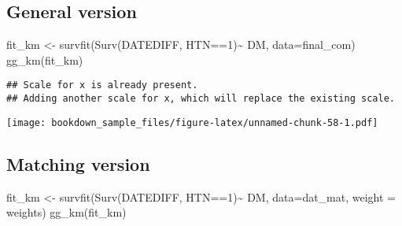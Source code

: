 \documentclass[
]{book}
\newenvironment{Shaded}{\begin{snugshade}}{\end{snugshade}}
\newcommand{\AttributeTok}[1]{\textcolor[rgb]{0.77,0.63,0.00}{#1}}
\newcommand{\DecValTok}[1]{\textcolor[rgb]{0.00,0.00,0.81}{#1}}
\newcommand{\FloatTok}[1]{\textcolor[rgb]{0.00,0.00,0.81}{#1}}
\newcommand{\FunctionTok}[1]{\textcolor[rgb]{0.00,0.00,0.00}{#1}}
\newcommand{\NormalTok}[1]{#1}
\newcommand{\OtherTok}[1]{\textcolor[rgb]{0.56,0.35,0.01}{#1}}
\newcommand{\SpecialCharTok}[1]{\textcolor[rgb]{0.00,0.00,0.00}{#1}}
\begin{document}
\begin{Shaded}
\end{Shaded}

\hypertarget{general-version}{%
\subsection{General version}\label{general-version}}

\begin{Shaded}
\begin{Highlighting}[]
\NormalTok{fit\_km }\OtherTok{\textless{}{-}} \FunctionTok{survfit}\NormalTok{(}\FunctionTok{Surv}\NormalTok{(DATEDIFF, HTN}\SpecialCharTok{==}\DecValTok{1}\NormalTok{)}\SpecialCharTok{\textasciitilde{}}\NormalTok{ DM, }\AttributeTok{data=}\NormalTok{final\_com)}
\FunctionTok{gg\_km}\NormalTok{(fit\_km)}
\end{Highlighting}
\end{Shaded}

\begin{verbatim}
## Scale for x is already present.
## Adding another scale for x, which will replace the existing scale.
\end{verbatim}

\texttt{[image: bookdown\_sample\_files/figure-latex/unnamed-chunk-58-1.pdf]}

\hypertarget{matching-version}{%
\subsection{Matching version}\label{matching-version}}

\begin{Shaded}
\begin{Highlighting}[]
\NormalTok{fit\_km }\OtherTok{\textless{}{-}} \FunctionTok{survfit}\NormalTok{(}\FunctionTok{Surv}\NormalTok{(DATEDIFF, HTN}\SpecialCharTok{==}\DecValTok{1}\NormalTok{)}\SpecialCharTok{\textasciitilde{}}\NormalTok{ DM, }\AttributeTok{data=}\NormalTok{dat\_mat, }\AttributeTok{weight =}\NormalTok{ weights)}
\FunctionTok{gg\_km}\NormalTok{(fit\_km)}
\end{Highlighting}
\end{Shaded}
\end{document}
